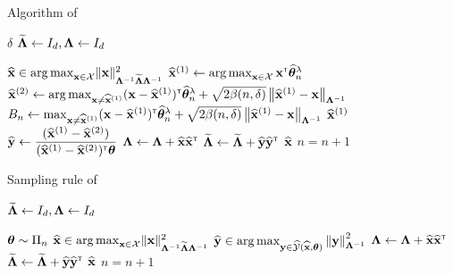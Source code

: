 \begin{algorithm}[ht]
\centering
\caption{Algorithm of \SLGapE{}}
\label{alg:slgape}
\begin{algorithmic}[1]
     $\delta$
     $\mathbf{\widetilde{\Lambda}} \leftarrow{} I_d, \mathbf{\Lambda}\leftarrow{} I_d$

        \State $\mathbf{\widehat{{\bf x}}}\in\operatorname*{arg\,max}_{{\bf x}\in\mathcal{X}}  \lVert{\bf x}\rVert_{\mathbf{\Lambda}^{-1} \mathbf{\widetilde{\Lambda}} \mathbf{\Lambda}^{-1} }^2$
        \State $\widehat{{\bf x}}^{(1)} \leftarrow \operatorname*{arg\,max}_{{\bf x}\in\mathcal{X}} {\bf x}^\mathsf{\scriptscriptstyle T}\widehat{{\boldsymbol \theta}}^{\lambda}_n$
        \State $\widehat{{\bf x}}^{(2)} \leftarrow \operatorname*{arg\,max}_{{\bf x}\neq\widehat{{\bf x}}^{(1)}} ({\bf x}-\widehat{{\bf x}}^{(1)})^\mathsf{\scriptscriptstyle T}\widehat{{\boldsymbol \theta}}^{\lambda}_n + \sqrt{2\beta(n,\delta)}\left\lVert\widehat{{\bf x}}^{(1)}-{\bf x}\right\rVert_{{\boldsymbol \Lambda}^{-1}}$
        \State $B_n \leftarrow \max_{{\bf x}\neq\widehat{{\bf x}}^{(1)}} ({\bf x}-\widehat{{\bf x}}^{(1)})^\mathsf{\scriptscriptstyle T}\widehat{{\boldsymbol \theta}}^{\lambda}_n + \sqrt{2\beta(n,\delta)}\left\lVert\widehat{{\bf x}}^{(1)}-{\bf x}\right\rVert_{{\boldsymbol \Lambda}^{-1}}$
            \State \Return $\widehat{{\bf x}}^{(1)}$
        \EndIf
        \State $\widehat{{\bf y}} \leftarrow{} \dfrac{(\widehat{{\bf x}}^{(1)}- \widehat{{\bf x}}^{(2)})}{(\widehat{{\bf x}}^{(1)}-\widehat{{\bf x}}^{(2)})^\mathsf{\scriptscriptstyle T}{\boldsymbol \theta}}$
        \State ${\boldsymbol \Lambda}\leftarrow{} \mathbf{\Lambda}+ \mathbf{\widehat{{\bf x}}}\mathbf{\widehat{{\bf x}}}^\mathsf{\scriptscriptstyle T}$
		\State $\mathbf{\widetilde{\Lambda}} \leftarrow{} \mathbf{\widetilde{\Lambda}} + \mathbf{\widehat{{\bf y}}}\mathbf{\widehat{{\bf y}}}^\mathsf{\scriptscriptstyle T}$
		\State {} $\widehat{{\bf x}}$
	    \State {}
	    \State $n = n+1$
   \EndFor
\end{algorithmic}
\end{algorithm}

\begin{algorithm}[ht]
\centering
\caption{Sampling rule of \SLTCC{}}
\label{alg:slt3c}
\begin{algorithmic}[1]
    $\mathbf{\widetilde{\Lambda}} \leftarrow{} I_d, \mathbf{\Lambda}\leftarrow{} I_d$

        \State {} ${\boldsymbol \theta} \sim \Pi_n$
        \State $\mathbf{\widehat{{\bf x}}}\in\operatorname*{arg\,max}_{{\bf x}\in\mathcal{X}}  \lVert{\bf x}\rVert_{\mathbf{\Lambda}^{-1} \mathbf{\widetilde{\Lambda}} \mathbf{\Lambda}^{-1} }^2$
        \State $\mathbf{\widehat{{\bf y}}}\in\operatorname*{arg\,max}_{{\bf y}\in\widehat{\mathcal{Y}}(\widehat{{\bf x}},{\boldsymbol \theta})}\left\lVert{\bf y}\right\rVert^2_{\mathbf{\Lambda}^{-1}}$
        \State $\mathbf{\Lambda}\leftarrow{} \mathbf{\Lambda}+ \mathbf{\widehat{{\bf x}}}\mathbf{\widehat{{\bf x}}}^\mathsf{\scriptscriptstyle T}$
		\State $\mathbf{\widetilde{\Lambda}} \leftarrow{} \mathbf{\widetilde{\Lambda}} + \mathbf{\widehat{{\bf y}}}\mathbf{\widehat{{\bf y}}}^\mathsf{\scriptscriptstyle T}$
		\State {} $\widehat{{\bf x}}$
	    \State {}
	    \State $n = n+1$
   \EndFor
\end{algorithmic}
\end{algorithm}

